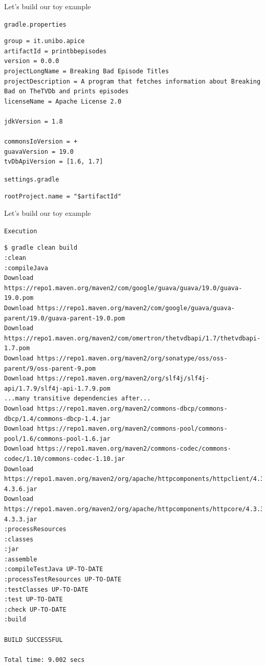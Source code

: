 \documentclass[presentation]{beamer}
\begin{document}
\begin{frame}[fragile]{Let's build our toy example}
	\begin{block}{\texttt{gradle.properties}}
		\begin{verbatim}
group = it.unibo.apice
artifactId = printbbepisodes
version = 0.0.0
projectLongName = Breaking Bad Episode Titles
projectDescription = A program that fetches information about Breaking Bad on TheTVDb and prints episodes
licenseName = Apache License 2.0

jdkVersion = 1.8

commonsIoVersion = +
guavaVersion = 19.0
tvDbApiVersion = [1.6, 1.7]
		\end{verbatim}
	\end{block}
	\begin{block}{\texttt{settings.gradle}}
		\begin{verbatim}
rootProject.name = "$artifactId"
		\end{verbatim}
	\end{block}
\end{frame}

\begin{frame}[fragile]{Let's build our toy example}
	\begin{block}{\texttt{Execution}}
		\begin{verbatim}
$ gradle clean build
:clean
:compileJava
Download https://repo1.maven.org/maven2/com/google/guava/guava/19.0/guava-19.0.pom
Download https://repo1.maven.org/maven2/com/google/guava/guava-parent/19.0/guava-parent-19.0.pom
Download https://repo1.maven.org/maven2/com/omertron/thetvdbapi/1.7/thetvdbapi-1.7.pom
Download https://repo1.maven.org/maven2/org/sonatype/oss/oss-parent/9/oss-parent-9.pom
Download https://repo1.maven.org/maven2/org/slf4j/slf4j-api/1.7.9/slf4j-api-1.7.9.pom
...many transitive dependencies after...
Download https://repo1.maven.org/maven2/commons-dbcp/commons-dbcp/1.4/commons-dbcp-1.4.jar
Download https://repo1.maven.org/maven2/commons-pool/commons-pool/1.6/commons-pool-1.6.jar
Download https://repo1.maven.org/maven2/commons-codec/commons-codec/1.10/commons-codec-1.10.jar
Download https://repo1.maven.org/maven2/org/apache/httpcomponents/httpclient/4.3.6/httpclient-4.3.6.jar
Download https://repo1.maven.org/maven2/org/apache/httpcomponents/httpcore/4.3.3/httpcore-4.3.3.jar
:processResources
:classes
:jar
:assemble
:compileTestJava UP-TO-DATE
:processTestResources UP-TO-DATE
:testClasses UP-TO-DATE
:test UP-TO-DATE
:check UP-TO-DATE
:build

BUILD SUCCESSFUL

Total time: 9.002 secs
		\end{verbatim}
	\end{block}
\end{frame}
\end{document}
